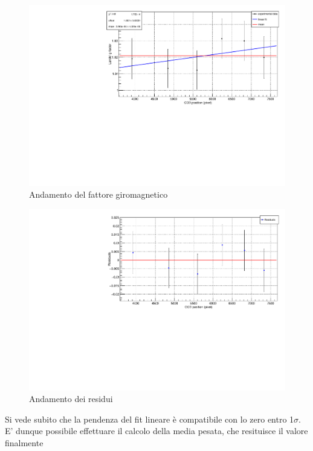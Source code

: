 \documentclass{article}
\begin{document}
	\begin{center}
		\begin{figure}[H]
			\centering
			\includegraphics[scale=0.38, angle=0]{campomax/g.pdf}
			\caption{Andamento del fattore giromagnetico}
			\label{fig:g}
		\end{figure}
	\end{center}

	\begin{center}
		\begin{figure}[H]
			\centering
			\includegraphics[scale=0.38, angle=0]{campomax/g_residuals.pdf}
			\caption{Andamento dei residui}
			\label{fig:g_res}
		\end{figure}
	\end{center}

	Si vede subito che la pendenza del fit lineare è compatibile con lo zero entro 1$\sigma$. E' dunque
	possibile effettuare il calcolo della media pesata, che resituisce il valore finalmente
\end{document}
